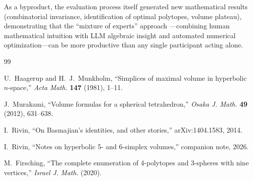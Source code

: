 \documentclass[11pt]{article}
\begin{document}
As a byproduct, the evaluation process itself generated new mathematical
results (combinatorial invariance, identification of optimal polytopes,
volume plateau), demonstrating that the ``mixture of experts'' approach
---combining human mathematical intuition with LLM algebraic insight
and automated numerical optimization---can be more productive than
any single participant acting alone.


\begin{thebibliography}{99}

U.~Haagerup and H.~J.~Munkholm,
``Simplices of maximal volume in hyperbolic $n$-space,''
\emph{Acta Math.} \textbf{147} (1981), 1--11.

J.~Murakami,
``Volume formulas for a spherical tetrahedron,''
\emph{Osaka J. Math.} \textbf{49} (2012), 631--638.

I.~Rivin,
``On Basmajian's identities, and other stories,''
arXiv:1404.1583, 2014.

I.~Rivin,
``Notes on hyperbolic 5- and 6-simplex volumes,''
companion note, 2026.

M.~Firsching,
``The complete enumeration of 4-polytopes and 3-spheres with nine vertices,''
\emph{Israel J. Math.} (2020).

\end{thebibliography}
\end{document}
